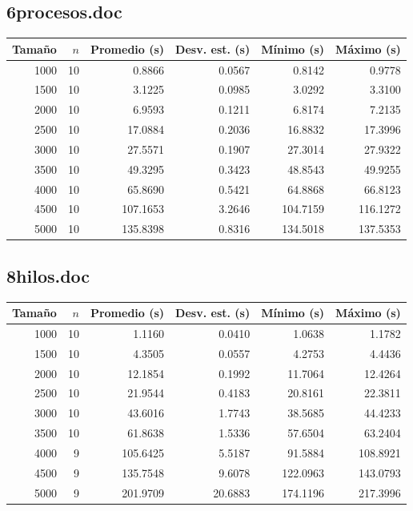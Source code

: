 \documentclass[conference]{IEEEtran}
\begin{document}
\subsection{6procesos.doc}
\begin{center}
\begin{tabular}{rrrrrr}
\toprule
Tamaño & $n$ & Promedio (s) & Desv. est. (s) & Mínimo (s) & Máximo (s) \\
\midrule
1000 & 10 & 0.8866 & 0.0567 & 0.8142 & 0.9778 \\
1500 & 10 & 3.1225 & 0.0985 & 3.0292 & 3.3100 \\
2000 & 10 & 6.9593 & 0.1211 & 6.8174 & 7.2135 \\
2500 & 10 & 17.0884 & 0.2036 & 16.8832 & 17.3996 \\
3000 & 10 & 27.5571 & 0.1907 & 27.3014 & 27.9322 \\
3500 & 10 & 49.3295 & 0.3423 & 48.8543 & 49.9255 \\
4000 & 10 & 65.8690 & 0.5421 & 64.8868 & 66.8123 \\
4500 & 10 & 107.1653 & 3.2646 & 104.7159 & 116.1272 \\
5000 & 10 & 135.8398 & 0.8316 & 134.5018 & 137.5353 \\
\bottomrule
\end{tabular}
\end{center}
\subsection{8hilos.doc}
\begin{center}
\begin{tabular}{rrrrrr}
\toprule
Tamaño & $n$ & Promedio (s) & Desv. est. (s) & Mínimo (s) & Máximo (s) \\
\midrule
1000 & 10 & 1.1160 & 0.0410 & 1.0638 & 1.1782 \\
1500 & 10 & 4.3505 & 0.0557 & 4.2753 & 4.4436 \\
2000 & 10 & 12.1854 & 0.1992 & 11.7064 & 12.4264 \\
2500 & 10 & 21.9544 & 0.4183 & 20.8161 & 22.3811 \\
3000 & 10 & 43.6016 & 1.7743 & 38.5685 & 44.4233 \\
3500 & 10 & 61.8638 & 1.5336 & 57.6504 & 63.2404 \\
4000 & 9 & 105.6425 & 5.5187 & 91.5884 & 108.8921 \\
4500 & 9 & 135.7548 & 9.6078 & 122.0963 & 143.0793 \\
5000 & 9 & 201.9709 & 20.6883 & 174.1196 & 217.3996 \\
\bottomrule
\end{tabular}
\end{center}
\end{document}

